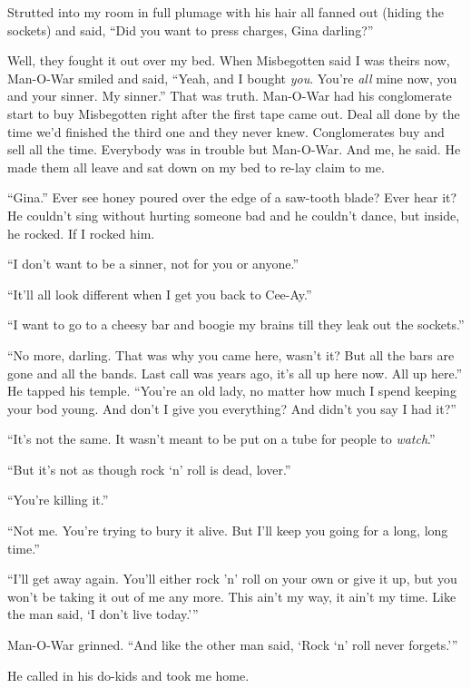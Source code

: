 Strutted into my room in full plumage with his hair all fanned out (hiding the sockets) and said, ``Did you want to press charges, Gina darling?''

Well, they fought it out over my bed. When Misbegotten said I was theirs now, Man-O-War smiled and said, ``Yeah, and I bought \textit{you}. You're \textit{all} mine now, you and your sinner. My sinner.'' That was truth. Man-O-War had his conglomerate start to buy Misbegotten right after the first tape came out. Deal all done by the time we'd finished the third one and they never knew. Conglomerates buy and sell all the time. Everybody was in trouble but Man-O-War. And me, he said. He made them all leave and sat down on my bed to re-lay claim to me.

``Gina.'' Ever see honey poured over the edge of a saw-tooth blade? Ever hear it? He couldn't sing without hurting someone bad and he couldn't dance, but inside, he rocked. If I rocked him.

``I don't want to be a sinner, not for you or anyone.''

``It'll all look different when I get you back to Cee-Ay.''

``I want to go to a cheesy bar and boogie my brains till they leak out the sockets.''

``No more, darling. That was why you came here, wasn't it? But all the bars are gone and all the bands. Last call was years ago, it's all up here now. All up here.'' He tapped his temple. ``You're an old lady, no matter how much I spend keeping your bod young. And don't I give you everything? And didn't you say I had it?''

``It's not the same. It wasn't meant to be put on a tube for people to \textit{watch}.''

``But it's not as though rock `n' roll is dead, lover.''

``You're killing it.''

``Not me. You're trying to bury it alive. But I'll keep you going for a long, long time.''

``I'll get away again. You'll either rock 'n' roll on your own or give it up, but you won't be taking it out of me any more. This ain't my way, it ain't my time. Like the man said, `I don't live today.'''

Man-O-War grinned. ``And like the other man said, `Rock `n' roll never forgets.'''

He called in his do-kids and took me home.
